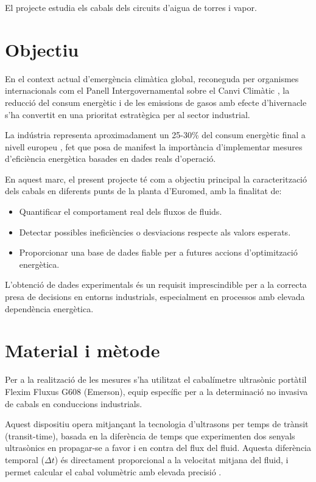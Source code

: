 \documentclass[11pt]{article}
\begin{document}
El projecte estudia els cabals dels circuits d'aigua de torres i vapor.

\section{Objectiu}

En el context actual d'emergència climàtica global, reconeguda per organismes internacionals com el Panell Intergovernamental sobre el Canvi Climàtic \cite{EU2023}, la reducció del consum energètic i de les emissions de gasos amb efecte d'hivernacle s'ha convertit en una prioritat estratègica per al sector industrial.

La indústria representa aproximadament un 25-30\% del consum energètic final a nivell europeu \cite{IPCC2023}, fet que posa de manifest la importància d'implementar mesures d'eficiència energètica basades en dades reals d'operació.

En aquest marc, el present projecte té com a objectiu principal la caracterització dels cabals en diferents punts de la planta d'Euromed, amb la finalitat de:

\begin{itemize}
    \item Quantificar el comportament real dels fluxos de fluids.
    \item Detectar possibles ineficiències o desviacions respecte als valors esperats.
    \item Proporcionar una base de dades fiable per a futures accions d'optimització
          energètica.
\end{itemize}


L'obtenció de dades experimentals és un requisit imprescindible per a la correcta presa de decisions en entorns industrials, especialment en processos amb elevada dependència energètica.

\section{Material i mètode}

Per a la realització de les mesures s'ha utilitzat el cabalímetre ultrasònic portàtil Flexim Fluxus G608 (Emerson), equip específic per a la determinació no invasiva de cabals en conduccions industrials.

Aquest dispositiu opera mitjançant la tecnologia d'ultrasons per temps de trànsit (transit-time), basada en la diferència de temps que experimenten dos senyals ultrasònics en propagar-se a favor i en contra del flux del fluid. Aquesta diferència temporal ($\Delta t$) és directament proporcional a la velocitat mitjana del fluid, i permet calcular el cabal volumètric amb elevada
precisió \cite{Emerson2024}.
\end{document}

